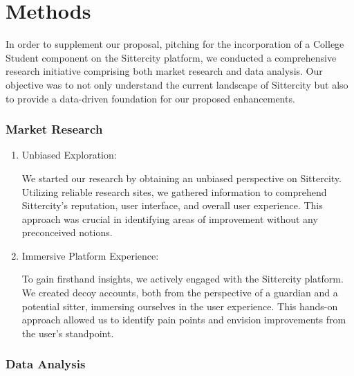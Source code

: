 \documentclass[12pt]{article}
\begin{document}
\hypertarget{methods}{%
\section{Methods}\label{methods}}

In order to supplement our proposal, pitching for the incorporation of a
College Student component on the Sittercity platform, we conducted a
comprehensive research initiative comprising both market research and
data analysis. Our objective was to not only understand the current
landscape of Sittercity but also to provide a data-driven foundation for
our proposed enhancements.

\hypertarget{market-research}{%
\subsubsection{Market Research}\label{market-research}}

\begin{enumerate}
\def\labelenumi{\arabic{enumi}.}
\item
  Unbiased Exploration:

  We started our research by obtaining an unbiased perspective on
  Sittercity. Utilizing reliable research sites, we gathered information
  to comprehend Sittercity's reputation, user interface, and overall
  user experience. This approach was crucial in identifying areas of
  improvement without any preconceived notions.
\item
  Immersive Platform Experience:

  To gain firsthand insights, we actively engaged with the Sittercity
  platform. We created decoy accounts, both from the perspective of a
  guardian and a potential sitter, immersing ourselves in the user
  experience. This hands-on approach allowed us to identify pain points
  and envision improvements from the user's standpoint.
\end{enumerate}

\hypertarget{data-analysis}{%
\subsubsection{Data Analysis}\label{data-analysis}}
\end{document}
